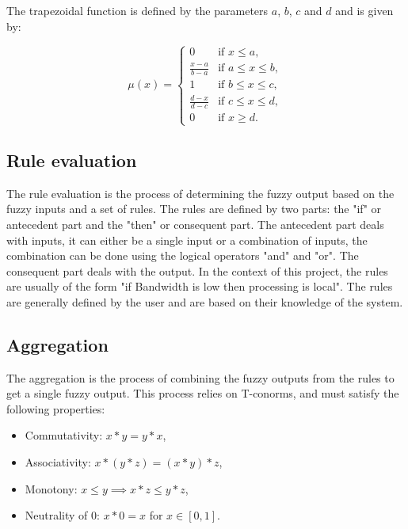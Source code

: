 The trapezoidal function is defined by the parameters $a$, $b$, $c$ and $d$ and is given by:

\begin{equation}
	\mu(x) = \begin{cases}
		0                   & \text{if } x \leq a,        \\
		\frac{x - a}{b - a} & \text{if } a \leq x \leq b, \\
		1                   & \text{if } b \leq x \leq c, \\
		\frac{d - x}{d - c} & \text{if } c \leq x \leq d, \\
		0                   & \text{if } x \geq d.
	\end{cases}
\end{equation}

\subsection{Rule evaluation}
\label{subsec:fuzzy-rule-evaluation}

The rule evaluation is the process of determining the fuzzy output based on the fuzzy inputs and a set of rules. The
rules are defined by two parts: the "if" or antecedent part and the "then" or consequent part. The antecedent part
deals with inputs, it can either be a single input or a combination of inputs, the combination can be done using the
logical operators "and" and "or". The consequent part deals with the output. In the context of this project, the rules
are usually of the form "if Bandwidth is low then processing is local". The rules are generally defined by the user
and are based on their knowledge of the system.

\subsection{Aggregation}
\label{subsec:fuzzy-aggregation}

The aggregation is the process of combining the fuzzy outputs from the rules to get a single fuzzy output. This process
relies on T-conorms, and must satisfy the following properties:

\begin{itemize}
	\item Commutativity: $x * y = y * x$,
	\item Associativity: $x * (y * z) = (x * y) * z$,
	\item Monotony: $x \leq y \implies x * z \leq y * z$,
	\item Neutrality of 0: $x * 0 = x$ for $x \in [0, 1]$.
\end{itemize}

